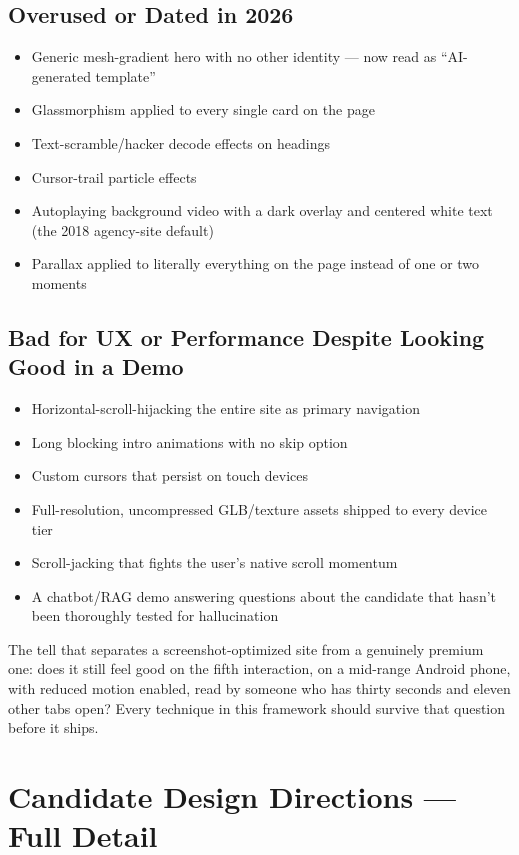 \documentclass[conference]{IEEEtran}
\begin{document}
\subsection{Overused or Dated in 2026}
\begin{itemize}[leftmargin=*]
\item Generic mesh-gradient hero with no other identity --- now read as ``AI-generated template''
\item Glassmorphism applied to every single card on the page
\item Text-scramble/hacker decode effects on headings
\item Cursor-trail particle effects
\item Autoplaying background video with a dark overlay and centered white text (the 2018 agency-site default)
\item Parallax applied to literally everything on the page instead of one or two moments
\end{itemize}

\subsection{Bad for UX or Performance Despite Looking Good in a Demo}
\begin{itemize}[leftmargin=*]
\item Horizontal-scroll-hijacking the entire site as primary navigation
\item Long blocking intro animations with no skip option
\item Custom cursors that persist on touch devices
\item Full-resolution, uncompressed GLB/texture assets shipped to every device tier
\item Scroll-jacking that fights the user's native scroll momentum
\item A chatbot/RAG demo answering questions about the candidate that hasn't been thoroughly tested for hallucination
\end{itemize}

The tell that separates a screenshot-optimized site from a genuinely premium one: does it still feel good on the fifth interaction, on a mid-range Android phone, with reduced motion enabled, read by someone who has thirty seconds and eleven other tabs open? Every technique in this framework should survive that question before it ships.

\section{Candidate Design Directions --- Full Detail}
\end{document}

